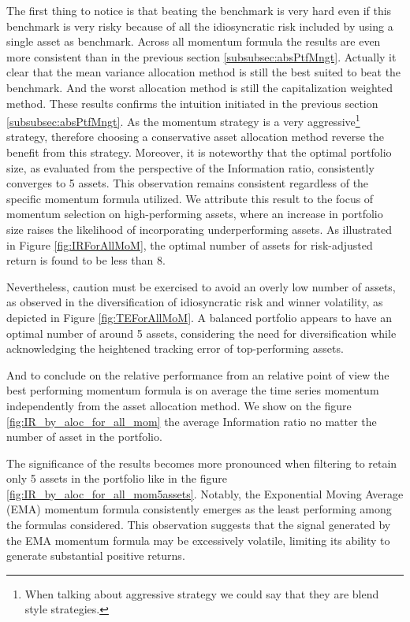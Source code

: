 \documentclass{article}
\begin{document}
The first thing to notice is that beating the benchmark is very hard even if this benchmark is very risky because of all the idiosyncratic risk included by using a single asset as benchmark.\newline
Across all momentum formula the results are even more consistent than in the previous section \ref{subsubsec:absPtfMngt}. Actually it clear that the mean variance allocation method is still the best suited to beat the benchmark. And the worst allocation method is still the capitalization weighted method. These results confirms the intuition initiated in the previous section \ref{subsubsec:absPtfMngt}. As the momentum strategy is a very aggressive\footnote{When talking about aggressive strategy we could say that they are blend style strategies.} strategy, therefore choosing a conservative asset allocation method reverse the benefit from this strategy.
\newline
Moreover, it is noteworthy that the optimal portfolio size, as evaluated from the perspective of the Information ratio, consistently converges to 5 assets. This observation remains consistent regardless of the specific momentum formula utilized. We attribute this result to the focus of momentum selection on high-performing assets, where an increase in portfolio size raises the likelihood of incorporating underperforming assets. As illustrated in Figure \ref{fig:IRForAllMoM}, the optimal number of assets for risk-adjusted return is found to be less than 8.

Nevertheless, caution must be exercised to avoid an overly low number of assets, as observed in the diversification of idiosyncratic risk and winner volatility, as depicted in Figure \ref{fig:TEForAllMoM}. A balanced portfolio appears to have an optimal number of around 5 assets, considering the need for diversification while acknowledging the heightened tracking error of top-performing assets.


And to conclude on the relative performance from an relative point of view the best performing momentum formula is on average the time series momentum independently from the asset allocation method. We show on the figure \ref{fig:IR_by_aloc_for_all_mom} the average Information ratio no matter the number of asset in the portfolio. 


The significance of the results becomes more pronounced when filtering to retain only 5 assets in the portfolio like in the figure \ref{fig:IR_by_aloc_for_all_mom5assets}. Notably, the Exponential Moving Average (EMA) momentum formula consistently emerges as the least performing among the formulas considered. This observation suggests that the signal generated by the EMA momentum formula may be excessively volatile, limiting its ability to generate substantial positive returns.
\end{document}
